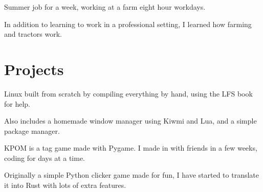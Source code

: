 \documentclass[]{plushcv}
\begin{document}
\begin{minipage}[t]{0.70\textwidth}
\begin{tightemize}
\sectionsep
\item Summer job for a week, working at a farm eight hour workdays.
\item In addition to learning to work in a professional setting, I learned how farming and tractors work.
\end{tightemize}
\sectionsep



\section{Projects}

\begin{tightemize}
\item Linux built from scratch by compiling everything by hand, using the LFS book for help. 
\item Also includes a homemade window manager using Kiwmi and Lua, and a simple package manager.
\end{tightemize}
\sectionsep

\begin{tightemize}
\item KPOM is a tag game made with Pygame. I made in with friends in a few weeks, coding for days at a time.
\end{tightemize}
\sectionsep

\begin{tightemize}
\item Originally a simple Python clicker game made for fun, I have started to translate it into Rust with lots of extra features. 
\end{tightemize}
\sectionsep




%
%

\end{minipage} 
\end{document}

